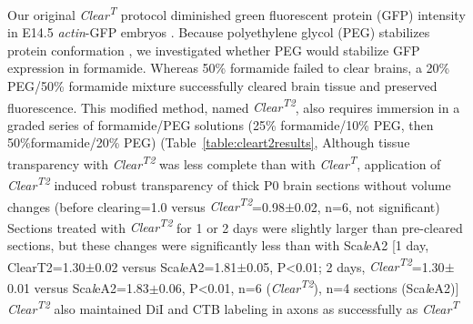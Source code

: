 Our original \emph{Clear\textsuperscript{T}} protocol diminished green fluorescent protein (GFP) intensity in E14.5 \emph{actin}-GFP embryos \cite{ikawa1995rapid}.
Because polyethylene glycol (PEG) stabilizes protein conformation \cite{rawat2010molecular}, we investigated whether PEG would stabilize GFP expression in formamide.
Whereas 50\% formamide failed to clear brains, a 20\% PEG/50\% formamide mixture successfully cleared brain tissue and preserved fluorescence.
This modified method, named \emph{Clear\textsuperscript{T2}}, also requires immersion in a graded series of formamide/PEG solutions (25\% formamide/10\% PEG, then 50\%formamide/20\% PEG) (Table~\ref{table:cleart2results}, %
Although tissue transparency with \emph{Clear\textsuperscript{T2}} was less complete than with \emph{Clear\textsuperscript{T}}, application of \emph{Clear\textsuperscript{T2}} induced robust transparency of thick P0 brain sections without volume changes (before clearing=1.0 versus \emph{Clear\textsuperscript{T2}}=0.98$\pm$0.02, n=6, not significant) %
Sections treated with \emph{Clear\textsuperscript{T2}} for 1 or 2 days were slightly larger than pre-cleared sections, but these changes were significantly less than with Sca\emph{l}eA2 [1 day, ClearT2=1.30$\pm$0.02 versus Sca\emph{l}eA2=1.81$\pm$0.05, P<0.01; 2 days, \emph{Clear\textsuperscript{T2}}=1.30$\pm$0.01 versus Sca\emph{l}eA2=1.83$\pm$0.06, P<0.01, n=6 (\emph{Clear\textsuperscript{T2}}), n=4 sections (Sca\emph{l}eA2)] %
\emph{Clear\textsuperscript{T2}} also maintained DiI and CTB labeling in axons as successfully as \emph{Clear\textsuperscript{T}} %
